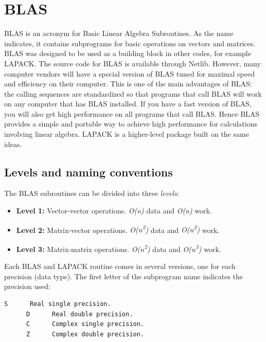\section{BLAS}

BLAS is an acronym for Basic Linear Algebra Subroutines. As the name indicates, it contains subprograms for basic operations on vectors and matrices. BLAS was designed to be used as a building block in other codes, for example LAPACK. The source code for BLAS is available through Netlib. However, many computer vendors will have a special version of BLAS tuned for maximal speed and efficiency on their computer. This is one of the main advantages of BLAS: the calling sequences are standardized so that programs that call BLAS will work on any computer that has BLAS installed. If you have a fast version of BLAS, you will also get high performance on all programs that call BLAS. Hence BLAS provides a simple and portable way to achieve high performance for calculations involving linear algebra. LAPACK is a higher-level package built on the same ideas.

\subsection{Levels and naming conventions}

The BLAS subroutines can be divided into three \emph{levels}:

\begin{itemize}
    \item \textbf{Level 1:} Vector-vector operations. \emph{O(n)} data and \emph{O(n)} work.
    \item \textbf{Level 2:} Matrix-vector operations. \emph{O(n\textsuperscript{2})} data and \emph{O(n\textsuperscript{2})} work.
    \item \textbf{Level 3:} Matrix-matrix operations. \emph{O(n\textsuperscript{2})} data and \emph{O(n\textsuperscript{3})} work.
\end{itemize}

Each BLAS and LAPACK routine comes in several versions, one for each precision (data type). The first letter of the subprogram name indicates the precision used:

\begin{lstlisting}[style=fortran77]
      S      Real single precision.
      D      Real double precision.
      C      Complex single precision.
      Z      Complex double precision.
\end{lstlisting}

